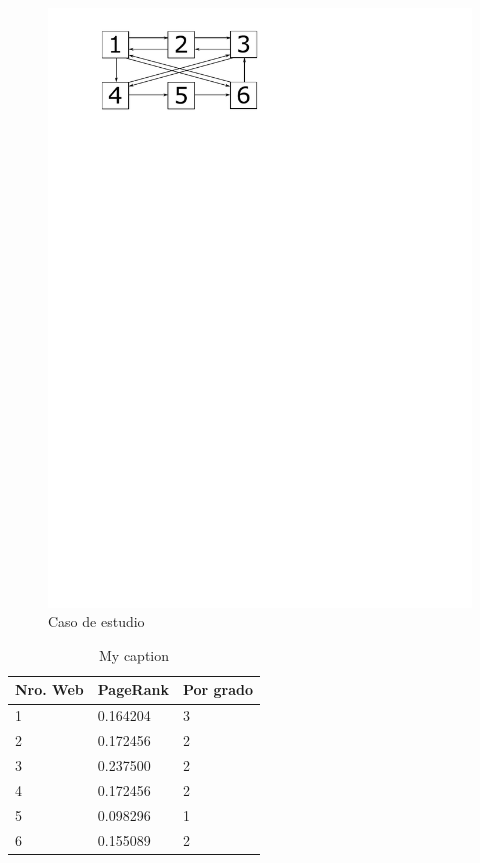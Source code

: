 \begin{figure}[h]
\centering
\includegraphics[scale=0.7]{images/drawing.pdf}
\caption{Caso de estudio}
\label{casoEst}
\end{figure}

\begin{table}[]
\centering
\caption{My caption}
\label{my-label}
\begin{tabular}{lll}
\hline
Nro. Web & PageRank & Por grado \\ \hline
1        & 0.164204 & 3         \\
2        & 0.172456 & 2         \\
3        & 0.237500 & 2         \\
4        & 0.172456 & 2         \\
5        & 0.098296 & 1         \\
6        & 0.155089 & 2         \\ \hline
\end{tabular}
\end{table}

